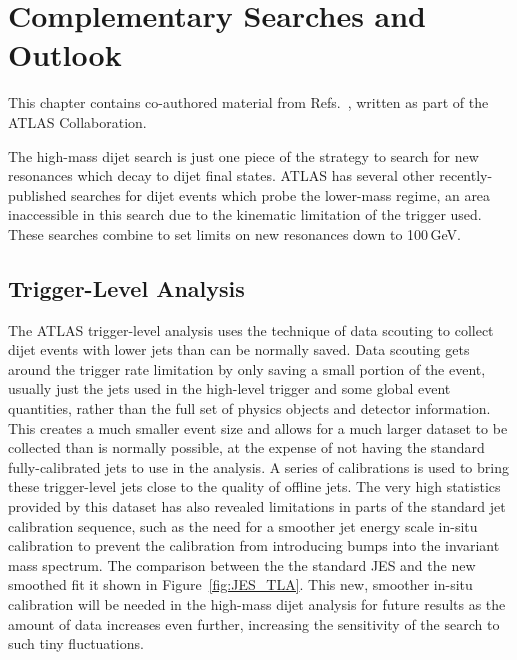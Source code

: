 
\chapter{Complementary Searches and Outlook}
\label{ch:Conclusion}
This chapter contains co-authored material from Refs.~\cite{DijetISR_Resolved}\cite{DijetTLA}\cite{DijetISR}, written as part of the ATLAS Collaboration.
\newline

The high-mass dijet search is just one piece of the strategy to search for new resonances which decay to dijet final states.  ATLAS has several other recently-published searches for dijet events which probe the lower-mass regime, an area inaccessible in this search due to the kinematic limitation of the trigger used.  These searches combine to set limits on new resonances down to 100\,GeV.

\section{Trigger-Level Analysis}
The ATLAS trigger-level analysis uses the technique of data scouting to collect dijet events with lower \pt jets than can be normally saved.  Data scouting gets around the trigger rate limitation by only saving a small portion of the event, usually just the jets used in the high-level trigger and some global event quantities, rather than the full set of physics objects and detector information.  This creates a much smaller event size and allows for a much larger dataset to be collected than is normally possible, at the expense of not having the standard fully-calibrated jets to use in the analysis.  A series of calibrations is used to bring these trigger-level jets close to the quality of offline jets.  The very high statistics provided by this dataset has also revealed limitations in parts of the standard jet calibration sequence, such as the need for a smoother jet energy scale in-situ calibration to prevent the calibration from introducing bumps into the invariant mass spectrum.  The comparison between the the standard JES and the new smoothed fit it shown in Figure~\ref{fig:JES_TLA}.  This new, smoother in-situ calibration will be needed in the high-mass dijet analysis for future results as the amount of data increases even further, increasing the sensitivity of the search to such tiny fluctuations.

